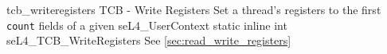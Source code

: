 %
%
%
%

\apidoc
{tcb_writeregisters}
{TCB - Write Registers}
{Set a thread's registers to the first \texttt{count} fields of a given seL4\_UserContext}
{static inline int seL4\_TCB\_WriteRegisters}
{
}
{\errorenumdesc}
{See \autoref{sec:read_write_registers}}

